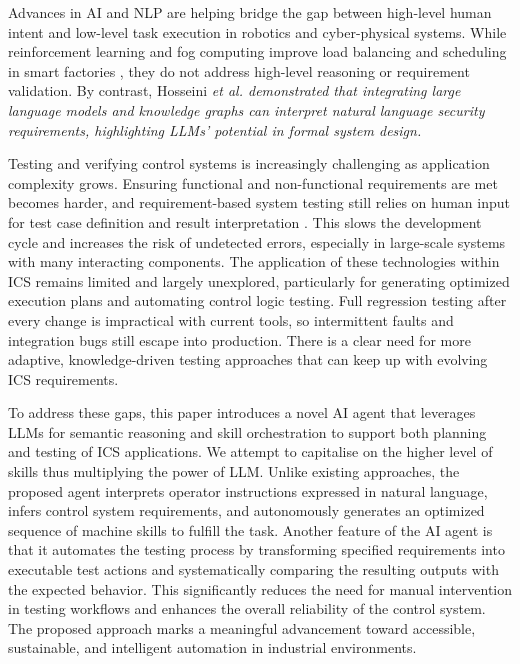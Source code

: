 \documentclass[conference]{IEEEtran}
\newcommand{\etal}{\it et al. \normalfont}
\begin{document}
Advances in AI and NLP are helping bridge the gap between high-level human intent and low-level task execution in robotics and cyber-physical systems. While reinforcement learning and fog computing improve load balancing and scheduling in smart factories \cite{wicaksono2024artificial}, they do not address high-level reasoning or requirement validation. By contrast, Hosseini \etal \cite{10904297} demonstrated that integrating large language models and knowledge graphs can interpret natural language security requirements, highlighting LLMs’ potential in formal system design. 

Testing and verifying control systems is increasingly challenging as application complexity grows. Ensuring functional and non-functional requirements are met becomes harder, and requirement-based system testing still relies on human input for test case definition and result interpretation \cite{dos2020software}. This slows the development cycle and increases the risk of undetected errors, especially in large-scale systems with many interacting components. The application of these technologies within ICS remains limited and largely unexplored, particularly for generating optimized execution plans and automating control logic testing. Full regression testing after every change is impractical with current tools, so intermittent faults and integration bugs still escape into production. There is a clear need for more adaptive, knowledge-driven testing approaches that can keep up with evolving ICS requirements.

To address these gaps, this paper introduces a novel AI agent that leverages LLMs for semantic reasoning and skill orchestration to support both planning and testing of ICS applications. We attempt to capitalise on the higher level of skills thus multiplying the power of LLM. Unlike existing approaches, the proposed agent interprets operator instructions expressed in natural language, infers control system requirements, and autonomously generates an optimized sequence of machine skills to fulfill the task. Another feature of the AI agent is that it automates the testing process by transforming specified requirements into executable test actions and systematically comparing the resulting outputs with the expected behavior. This significantly reduces the need for manual intervention in testing workflows and enhances the overall reliability of the control system. The proposed approach marks a meaningful advancement toward accessible, sustainable, and intelligent automation in industrial environments.
\end{document}
